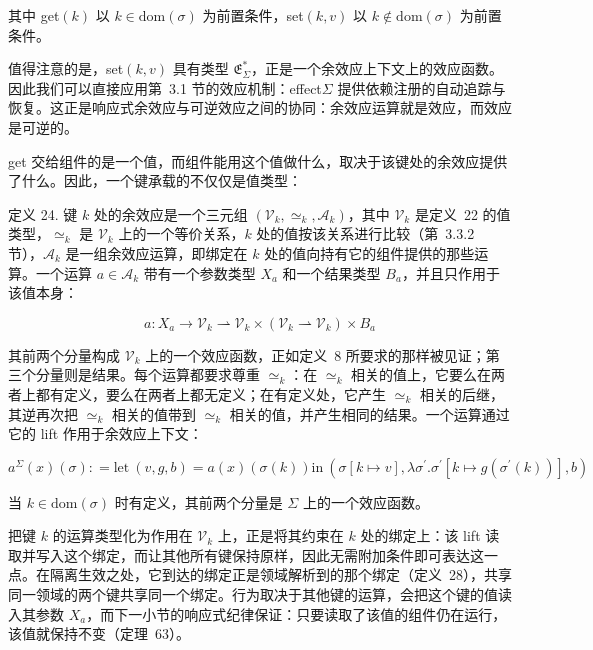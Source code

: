 \documentclass[
  10
]{article}
\begin{document}
其中 get\(( k )\) 以 \(k \in \mathrm { d o m } ( \sigma )\) 为前置条件，set\(( k , v )\) 以 \(k \notin \mathrm { d o m } ( \sigma )\) 为前置条件。

值得注意的是，set\(( k , v )\) 具有类型 \(\mathfrak { E } _ { \Sigma } ^ { * }\)，正是一个余效应上下文上的效应函数。因此我们可以直接应用第~3.1 节的效应机制：effect\(\Sigma\) 提供依赖注册的自动追踪与恢复。这正是响应式余效应与可逆效应之间的协同：余效应运算就是效应，而效应是可逆的。

get 交给组件的是一个值，而组件能用这个值做什么，取决于该键处的余效应提供了什么。因此，一个键承载的不仅仅是值类型：

定义 24. 键 \(k\) 处的余效应是一个三元组 \(\left( \mathcal { V } _ { k } , \simeq _ { k } , \mathcal { A } _ { k } \right)\)，其中 \(\mathcal { V } _ { k }\) 是定义~22 的值类型，\(\simeq _ { k }\) 是 \(\mathcal { V } _ { k }\) 上的一个等价关系，\(k\) 处的值按该关系进行比较（第~3.3.2 节），\(\mathcal { A } _ { k }\) 是一组余效应运算，即绑定在 \(k\) 处的值向持有它的组件提供的那些运算。一个运算 \(a \in \mathcal { A } _ { k }\) 带有一个参数类型 \(X _ { a }\) 和一个结果类型 \(B _ { a }\)，并且只作用于该值本身：

\[
a : X _ { a } \to \mathcal { V } _ { k } \rightharpoonup \mathcal { V } _ { k } \times ( \mathcal { V } _ { k } \rightharpoonup \mathcal { V } _ { k } ) \times B _ { a }\tag{22}
\]

其前两个分量构成 \(\mathcal { V } _ { k }\) 上的一个效应函数，正如定义~8 所要求的那样被见证；第三个分量则是结果。每个运算都要求尊重 \(\simeq _ { k }\)：在 \(\simeq _ { k }\) 相关的值上，它要么在两者上都有定义，要么在两者上都无定义；在有定义处，它产生 \(\simeq _ { k }\) 相关的后继，其逆再次把 \(\simeq _ { k }\) 相关的值带到 \(\simeq _ { k }\) 相关的值，并产生相同的结果。一个运算通过它的 lift 作用于余效应上下文：

\[
a ^ { \Sigma } ( x ) ( \sigma ) : = \mathrm { { l e t } } \ ( v , g , b ) = a ( x ) ( \sigma ( k ) ) \mathrm { { i n } } \ ( \sigma [ k \mapsto v ] , \lambda \sigma ^ { \prime } . \sigma ^ { \prime } [ k \mapsto g ( \sigma ^ { \prime } ( k ) ) ] , b )\tag{23}
\]

当 \(k \in \mathrm { d o m } ( \sigma )\) 时有定义，其前两个分量是 \(\Sigma\) 上的一个效应函数。

把键 \(k\) 的运算类型化为作用在 \(\mathcal { V } _ { k }\) 上，正是将其约束在 \(k\) 处的绑定上：该 lift 读取并写入这个绑定，而让其他所有键保持原样，因此无需附加条件即可表达这一点。在隔离生效之处，它到达的绑定正是领域解析到的那个绑定（定义~28），共享同一领域的两个键共享同一个绑定。行为取决于其他键的运算，会把这个键的值读入其参数 \(X _ { a }\)，而下一小节的响应式纪律保证：只要读取了该值的组件仍在运行，该值就保持不变（定理~63）。
\end{document}

